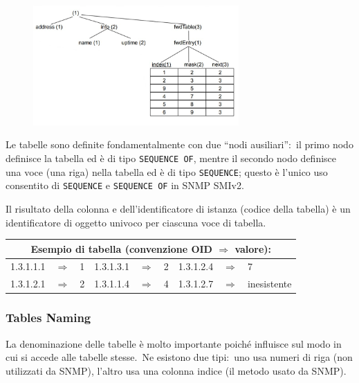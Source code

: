 \begin{figure}[H]
    \centering
    \includegraphics[width=0.7\textwidth]{immagini/Tables_MIB.jpg}
\end{figure}

\noindent Le tabelle sono definite fondamentalmente con due ``nodi ausiliari'':\ il primo nodo definisce la tabella ed è di tipo \texttt{SEQUENCE OF}, mentre il secondo nodo definisce una voce (una riga) nella tabella ed è di tipo \texttt{SEQUENCE}; questo è l'unico uso consentito di \texttt{SEQUENCE} e \texttt{SEQUENCE OF} in SNMP SMIv2.\

Il risultato della colonna e dell'identificatore di istanza (codice della tabella) è un identificatore di oggetto univoco per ciascuna voce di tabella.

\begin{table}[H]
    \centering
    \begin{tabular}{|l l l|l l l|l l l|}
        \multicolumn{9}{c}{Esempio di tabella (convenzione OID $\Rightarrow$ valore):}                          \\\hline
        1.3.1.1.1 & $\Rightarrow$ & 1 & 1.3.1.3.1 & $\Rightarrow$ & 2 & 1.3.1.2.4 & $\Rightarrow$ & 7           \\
        1.3.1.2.1 & $\Rightarrow$ & 2 & 1.3.1.1.4 & $\Rightarrow$ & 4 & 1.3.1.2.7 & $\Rightarrow$ & inesistente \\\hline
    \end{tabular}
\end{table}

\subsubsection{Tables Naming}

La denominazione delle tabelle è molto importante poiché influisce sul modo in cui si accede alle tabelle stesse.\
Ne esistono due tipi:\ uno usa numeri di riga (non utilizzati da SNMP), l'altro usa una colonna indice (il metodo usato da SNMP).

